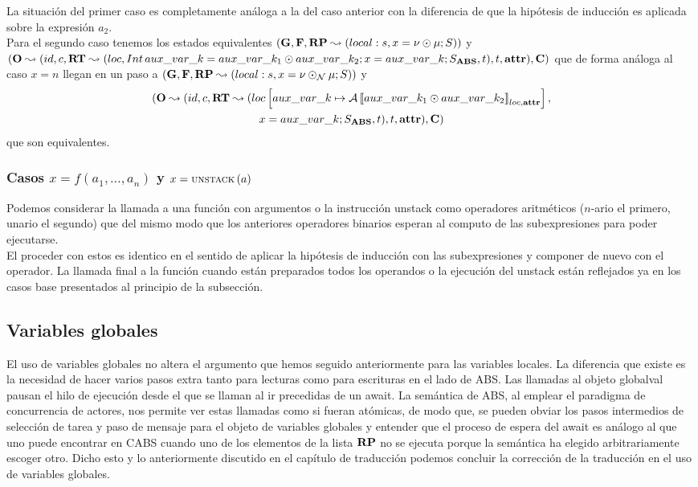 La situación del primer caso es completamente análoga a la del caso anterior con la diferencia de que la hipótesis de inducción es aplicada sobre la expresión $a_2$.\\

Para el segundo caso tenemos los estados equivalentes $(\mathbf{G}, \mathbf{F}, \textbf{RP} \leadsto (local:s,x = \nu \odot \mu\mbox{;\,}S))$ y $(\mathbf{O} \leadsto (id, c, \textbf{RT} \leadsto (loc, Int\,aux\_var\_k =  aux\_var\_k_1 \odot  aux\_var\_k_2\mbox{;\,} x = aux\_var\_k\mbox{;\,} S_{\textbf{ABS}}, t), t, \textbf{attr}), \mathbf{C})$ que de forma análoga al caso $x = n$ llegan en un paso a $(\mathbf{G}, \mathbf{F}, \textbf{RP} \leadsto (local:s,x = \nu \odot_{\mathcal{N}} \mu\mbox{;\,}S))$ y
\begin{multline*}
  (\mathbf{O} \leadsto (id, c, \textbf{RT} \leadsto (loc \left[ aux\_var\_k\mapsto\mathcal{A} \left\llbracket aux\_var\_k_1 \odot  aux\_var\_k_2 \right\rrbracket_{loc, \textbf{attr}} \right],\\
  x = aux\_var\_k\mbox{;\,}S_{\textbf{ABS}}, t), t, \textbf{attr}), \mathbf{C})
\end{multline*}
que son equivalentes.

\subsubsection{Casos $x = f(a_1, \dots, a_n)$ y $x = \text{\scriptsize{UNSTACK}}\left(a\right)$}
Podemos considerar la llamada a una función con argumentos o la instrucción unstack como operadores aritméticos ($n$-ario el primero, unario el segundo) que del mismo modo que los anteriores operadores binarios esperan al computo de las subexpresiones para poder ejecutarse.\\

El proceder con estos es identico en el sentido de aplicar la hipótesis de inducción con las subexpresiones y componer de nuevo con el operador. La llamada final a la función cuando están preparados todos los operandos o la ejecución del unstack están reflejados ya en los casos base presentados al principio de la subsección.

\subsection{Variables globales}

El uso de variables globales no altera el argumento que hemos seguido anteriormente para las variables locales. La diferencia que existe es la necesidad de hacer varios pasos extra tanto para lecturas como para escrituras en el lado de ABS. Las llamadas al objeto globalval pausan el hilo de ejecución desde el que se llaman al ir precedidas de un await. La semántica de ABS, al emplear el paradigma de concurrencia de actores, nos permite ver estas llamadas como si fueran atómicas, de modo que, se pueden obviar los pasos intermedios de selección de tarea y paso de mensaje para el objeto de variables globales y entender que el proceso de espera del await es análogo al que uno puede encontrar en CABS cuando uno de los elementos de la lista $\textbf{RP}$ no se ejecuta porque la semántica ha elegido arbitrariamente escoger otro. Dicho esto y lo anteriormente discutido en el capítulo de traducción podemos concluir la corrección de la traducción en el uso de variables globales.

